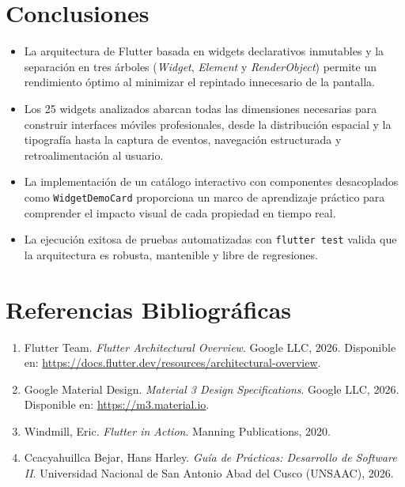 \documentclass[12pt,a4paper]{article}
\begin{document}
\section{Conclusiones}

\begin{itemize}[leftmargin=*]
    \item La arquitectura de Flutter basada en widgets declarativos inmutables y la separación en tres árboles (\textit{Widget}, \textit{Element} y \textit{RenderObject}) permite un rendimiento óptimo al minimizar el repintado innecesario de la pantalla.
    \item Los 25 widgets analizados abarcan todas las dimensiones necesarias para construir interfaces móviles profesionales, desde la distribución espacial y la tipografía hasta la captura de eventos, navegación estructurada y retroalimentación al usuario.
    \item La implementación de un catálogo interactivo con componentes desacoplados como \texttt{WidgetDemoCard} proporciona un marco de aprendizaje práctico para comprender el impacto visual de cada propiedad en tiempo real.
    \item La ejecución exitosa de pruebas automatizadas con \texttt{flutter test} valida que la arquitectura es robusta, mantenible y libre de regresiones.
\end{itemize}

\section{Referencias Bibliográficas}

\begin{enumerate}[leftmargin=*]
    \item Flutter Team. \textit{Flutter Architectural Overview}. Google LLC, 2026. Disponible en: \url{https://docs.flutter.dev/resources/architectural-overview}.
    \item Google Material Design. \textit{Material 3 Design Specifications}. Google LLC, 2026. Disponible en: \url{https://m3.material.io}.
    \item Windmill, Eric. \textit{Flutter in Action}. Manning Publications, 2020.
    \item Ccacyahuillca Bejar, Hans Harley. \textit{Guía de Prácticas: Desarrollo de Software II}. Universidad Nacional de San Antonio Abad del Cusco (UNSAAC), 2026.
\end{enumerate}
\end{document}
